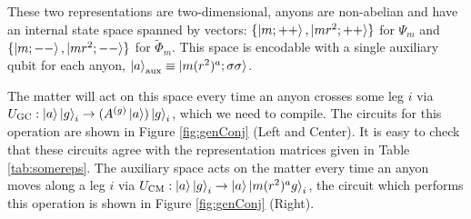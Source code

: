 \documentclass[two column]{article}
\begin{document}
These two representations are two-dimensional, anyons are non-abelian and have an internal state space spanned by vectors: $\{\ket{m; ++}, \ket{mr^2; ++}\}$ for $\Psi_m$ and $\{\ket{m; --}, \ket{mr^2; --}\}$ for $\tilde{\Phi}_m$.
This space is encodable with a single auxiliary qubit for each anyon, $\ket{a}_{\text{aux}} \equiv \ket{m(r^2)^a; \sigma\sigma}$.

The matter will act on this space every time an anyon crosses some leg $i$ via $U_{\text{GC}}: \ket{a}\ket{g}_i \rightarrow (A^{(g)}\ket{a})\ket{g}_i$, which we need to compile.
The circuits for this operation are shown in Figure \ref{fig:genConj} (Left and Center).
It is easy to check that these circuits agree with the representation matrices given in Table \ref{tab:somereps}. 
The auxiliary space acts on the matter every time an anyon moves along a leg $i$ via $U_{\text{CM}}: \ket{a}\ket{g}_i \rightarrow \ket{a}\ket{m(r^2)^a g}_i$, the circuit which performs this operation is shown in Figure \ref{fig:genConj} (Right).
\end{document}
